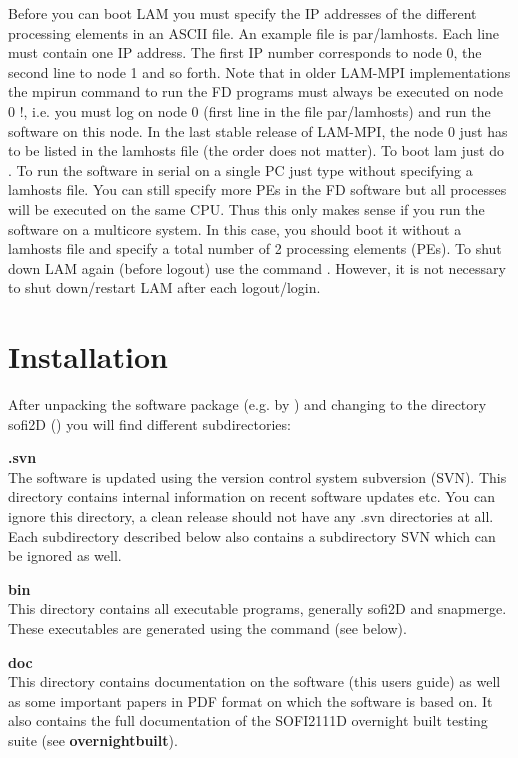 \documentclass[11pt,onecolumn,oneside]{article}
\begin{document}
Before you can boot LAM you must specify the IP addresses of the different processing elements in an ASCII file. An example file is par/lamhosts. Each line must contain one IP address. The first IP number corresponds to node 0, the second line to node 1 and so forth. Note that in older LAM-MPI implementations the mpirun command to run the FD programs must always be executed on node 0 !,
i.e. you must log on node 0 (first line in the file par/lamhosts) and run the software on this node. In the last stable release of LAM-MPI, the node 0 just has to be listed in the lamhosts file (the order does not matter). To boot lam just do . To run the software in serial on a single PC just type  without specifying a lamhosts file. You can still specify more PEs in the FD software but all processes will be executed on the same CPU. Thus this only makes sense if you run the software on a multicore system. In this case, you should boot it without
a lamhosts file and specify a total number of 2 processing elements (PEs). To shut down LAM again (before logout) use the command . However, it is not necessary to shut down/restart LAM after each logout/login. 

\section{Installation}
\label{installation}
After unpacking the software package (e.g. by ) and changing to the directory sofi2D ()  you will find different subdirectories:

\textbf{.svn}\\
The software is updated using the version control system subversion (SVN). This directory contains internal information on recent software updates etc. You can ignore this directory, a clean release should not have any .svn directories at all. Each subdirectory described below also contains a subdirectory SVN which can be ignored as well.

\textbf{bin}\\
This directory contains all executable programs, generally sofi2D and snapmerge. These executables are generated using the command  (see below).

\textbf{doc}\\
This directory contains documentation on the software (this users guide) as well as some important papers in PDF format on which the software is based on. It also contains the full documentation of the SOFI2111D overnight built testing suite (see \textbf{overnightbuilt}).
\end{document}
